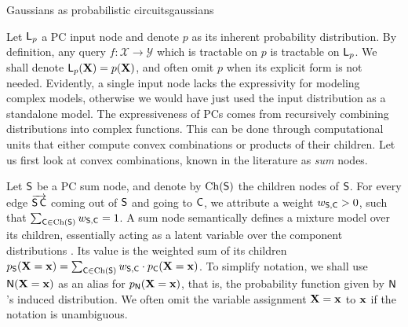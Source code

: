 \begin{example}[sidebyside,lefthand width=0.6\textwidth]{Gaussians as probabilistic circuits}{gaussians}
\begin{center}
  \end{center}
\end{example}
Let $\operatorname{\textsf{L}}_p$ a PC input node and denote $p$ as its inherent probability distribution. By
definition, any query $f:\mathcal{X}\to \mathcal{Y}$ which is tractable on $p$ is tractable on
$\operatorname{\textsf{L}}_p$. We shall denote $\operatorname{\textsf{L}}_p(\mathbf{X})=p(\mathbf{X})$, and often omit $p$ when its explicit form
is not needed. Evidently, a single input node lacks the expressivity for modeling complex models, otherwise we
would have just used the input distribution as a standalone model. The expressiveness of PCs comes
from recursively combining distributions into complex functions. This can be done through
computational units that either compute convex combinations or products of their children. Let us
first look at convex combinations, known in the literature as \emph{sum} nodes.

Let $\operatorname{\textsf{S}}$ be a PC sum node, and denote by $\operatorname*{\normalfont{Ch}}(\operatorname{\textsf{S}})$ the children nodes of $\operatorname{\textsf{S}}$. For every edge
$\overrightarrow{\operatorname{\textsf{S}}\operatorname{\textsf{C}}}$ coming out of $\operatorname{\textsf{S}}$ and going to $\operatorname{\textsf{C}}$, we attribute a weight $w_{\operatorname{\textsf{S}},
\operatorname{\textsf{C}}}>0$, such that $\sum_{\operatorname{\textsf{C}}\in\operatorname*{\normalfont{Ch}}(\operatorname{\textsf{S}})} w_{\operatorname{\textsf{S}},\operatorname{\textsf{C}}} = 1$. A sum node semantically
defines a mixture model over its children, essentially acting as a latent variable over the
component distributions \citep{poon11,peharz16}. Its value is the weighted sum of its children
$p_{\operatorname{\textsf{S}}}(\mathbf{X}=\mathbf{x})=\sum_{\operatorname{\textsf{C}}\in\operatorname*{\normalfont{Ch}}(\operatorname{\textsf{S}})}w_{\operatorname{\textsf{S}},\operatorname{\textsf{C}}}\cdot
p_{\operatorname{\textsf{C}}}(\mathbf{X}=\mathbf{x})$. To simplify notation, we shall use $\operatorname{\textsf{N}}(\mathbf{X}=\mathbf{x})$ as an
alias for $p_{\operatorname{\textsf{N}}}(\mathbf{X}=\mathbf{x})$, that is, the probability function given by $\operatorname{\textsf{N}}$'s
induced distribution. We often omit the variable assignment $\mathbf{X}=\mathbf{x}$ to $\mathbf{x}$ if the
notation is unambiguous.

